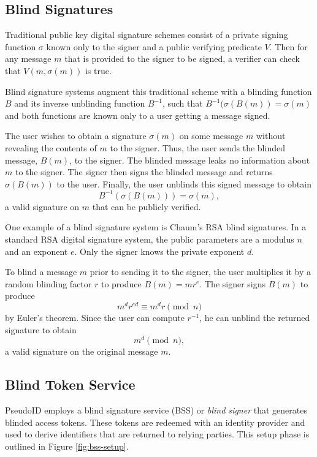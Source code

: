 \documentclass{llncs}
\begin{document}
\subsection{Blind Signatures}
\label{section:blind-sigs}

Traditional public key digital signature schemes \cite{DH76} consist
of a private signing function $\sigma$ known only to the signer and a
public verifying predicate $V$. Then for any message $m$ that is
provided to the signer to be signed, a verifier can check that $V(m,
\sigma(m))$ is true.

Blind signature systems \cite{Cha82} augment this traditional scheme
with a blinding function $B$ and its inverse unblinding function
$B^{-1}$, such that $B^{-1}(\sigma(B(m)) = \sigma(m)$ and both
functions are known only to a user getting a message signed.

The user wishes to obtain a signature $\sigma(m)$ on some message
$m$ without revealing the contents of $m$ to the signer. Thus, the
user sends the blinded message, $B(m)$, to the signer. The blinded
message leaks no information about $m$ to the signer. The signer then
signs the blinded message and returns $\sigma(B(m))$ to the
user. Finally, the user unblinds this signed message to
obtain $$B^{-1}(\sigma(B(m))) = \sigma(m),$$ a valid signature on $m$
that can be publicly verified.

One example of a blind signature system is Chaum's RSA blind signatures. In a
standard RSA digital signature system, the public parameters are a modulus $n$
and an exponent $e$. Only the signer knows the private exponent $d$.

To blind a message $m$ prior to sending it to the signer, the user
multiplies it by a random blinding factor $r$ to produce $B(m) =
mr^e$. The signer signs $B(m)$ to produce $$m^d r^{ed} \equiv m^d r
\pmod n$$ by Euler's theorem. Since the user can compute $r^{-1}$,
he can unblind the returned signature to obtain $$m^d \pmod n,$$ a
valid signature on the original message $m$.


\subsection{Blind Token Service}

PseudoID employs a blind signature service (BSS) or \emph{blind
  signer} that generates blinded access tokens. These tokens are
redeemed with an identity provider and used to derive identifiers that
are returned to relying parties. This setup phase is outlined in
Figure \ref{fig:bss-setup}.
\end{document}
